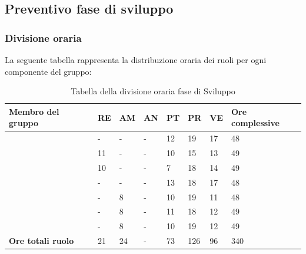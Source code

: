 \subsection{Preventivo fase di sviluppo}

\subsubsection{Divisione oraria}
La seguente tabella rappresenta la distribuzione oraria dei ruoli per ogni componente del gruppo:
{
	\renewcommand{\arraystretch}{2}
	\begin{longtable}[h!] { C{3.5cm} C{1cm} C{1cm} C{1cm} C{1cm} C{1cm} C{1cm} C{2cm}}
	\caption{Tabella della divisione oraria fase di Sviluppo}\\
	\rowcolor{\primaryColor}
	
	\textcolor{\secondaryColor}{\textbf{Membro del gruppo}} & 
	\textcolor{\secondaryColor}{\textbf{RE}} & 
	\textcolor{\secondaryColor}{\textbf{AM}} & 
	\textcolor{\secondaryColor}{\textbf{AN}} & 
	\textcolor{\secondaryColor}{\textbf{PT}} & 
	\textcolor{\secondaryColor}{\textbf{PR}} & 
	\textcolor{\secondaryColor}{\textbf{VE}} & 
	\textcolor{\secondaryColor}{\textbf{Ore complessive}}\\	
	\endhead
	
	\AW{}                     & - & - & - & 12 & 19 & 17 & 48 \\
	\AT{}                     & 11 & - & - & 10 & 15 & 13 & 49 \\
	\AD{}                     & 10 & - & - & 7 & 18 & 14 & 49 \\
	\EC{}                     & - & - & - & 13 & 18 & 17 & 48 \\
	\EM{}                     & - & 8 & - & 10 & 19 & 11 & 48 \\
	\FP{}                     & - & 8 & - & 11 & 18 & 12 & 49 \\
	\GG{}                     & - & 8 & - & 10 & 19 & 12 & 49 \\
	\textbf{Ore totali ruolo} & 21 & 24 & - & 73 & 126 & 96 & 340\\
	
	\end{longtable}
}


